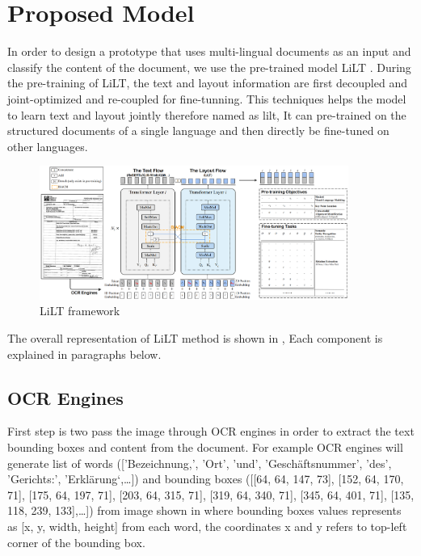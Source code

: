 \section{Proposed Model}
In order to design a prototype that uses multi-lingual documents as an input and classify the content of the document, we use the pre-trained model LiLT  \cite{wang-etal-2022-lilt}. During the pre-training of LiLT, the text and layout information are first decoupled and joint-optimized and re-coupled for fine-tunning. This techniques helps the model to learn text and layout jointly therefore named as \acrfull{lilt}, It can pre-trained on the structured documents of a single language and then directly be fine-tuned on other languages. 

\begin{figure}[hb]
    \centering
    \includegraphics[width=0.9\textwidth]{chapters/images/Methods/Proposed Model/lilt_framework.png}
    \caption{LiLT framework \cite{wang-etal-2022-lilt}}
    \label{fig:lilt_framework}
\end{figure}

The overall representation of LiLT method is shown in , Each component is explained in paragraphs below. 

\subsection{OCR Engines}
First step is two pass the image through OCR engines in order to extract the text bounding boxes and content from the document. For example OCR engines will generate list of words (['Bezeichnung,', 'Ort', 'und', 'Geschäftsnummer', 'des', 'Gerichts:', 'Erklärung‘,…]) and bounding boxes ([[64, 64, 147, 73], [152, 64, 170, 71], [175, 64, 197, 71], [203, 64, 315, 71], [319, 64, 340, 71], [345, 64, 401, 71], [135, 118, 239, 133],…]) from image shown in  where bounding boxes values represents as [x, y, width, height] from each word, the coordinates x and y refers to top-left corner of the bounding box. 

